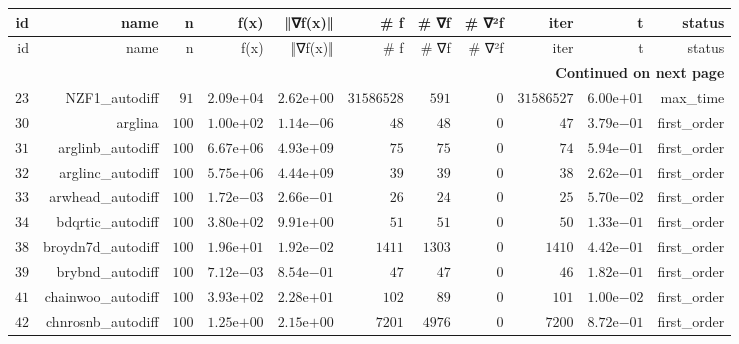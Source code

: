 \documentclass[varwidth=20cm,crop=true]{standalone}
\begin{document}
\begin{longtable}{rrrrrrrrrrr}
  \hline
  id & name & n & f(x) & ‖∇f(x)‖ & # f & # ∇f & # ∇²f & iter & t & status \\\hline
  \endfirsthead
  \hline
  id & name & n & f(x) & ‖∇f(x)‖ & # f & # ∇f & # ∇²f & iter & t & status \\\hline
  \endhead
  \hline
  \multicolumn{11}{r}{{\bfseries Continued on next page}}\\
  \hline
  \endfoot
  \endlastfoot
  \(    23\) & NZF1\_autodiff & \(    91\) & \( 2.09\)e\(+04\) & \( 2.62\)e\(+00\) & \(31586528\) & \(   591\) & \(     0\) & \(31586527\) & \( 6.00\)e\(+01\) & max\_time \\
  \(    30\) & arglina & \(   100\) & \( 1.00\)e\(+02\) & \( 1.14\)e\(-06\) & \(    48\) & \(    48\) & \(     0\) & \(    47\) & \( 3.79\)e\(-01\) & first\_order \\
  \(    31\) & arglinb\_autodiff & \(   100\) & \( 6.67\)e\(+06\) & \( 4.93\)e\(+09\) & \(    75\) & \(    75\) & \(     0\) & \(    74\) & \( 5.94\)e\(-01\) & first\_order \\
  \(    32\) & arglinc\_autodiff & \(   100\) & \( 5.75\)e\(+06\) & \( 4.44\)e\(+09\) & \(    39\) & \(    39\) & \(     0\) & \(    38\) & \( 2.62\)e\(-01\) & first\_order \\
  \(    33\) & arwhead\_autodiff & \(   100\) & \( 1.72\)e\(-03\) & \( 2.66\)e\(-01\) & \(    26\) & \(    24\) & \(     0\) & \(    25\) & \( 5.70\)e\(-02\) & first\_order \\
  \(    34\) & bdqrtic\_autodiff & \(   100\) & \( 3.80\)e\(+02\) & \( 9.91\)e\(+00\) & \(    51\) & \(    51\) & \(     0\) & \(    50\) & \( 1.33\)e\(-01\) & first\_order \\
  \(    38\) & broydn7d\_autodiff & \(   100\) & \( 1.96\)e\(+01\) & \( 1.92\)e\(-02\) & \(  1411\) & \(  1303\) & \(     0\) & \(  1410\) & \( 4.42\)e\(-01\) & first\_order \\
  \(    39\) & brybnd\_autodiff & \(   100\) & \( 7.12\)e\(-03\) & \( 8.54\)e\(-01\) & \(    47\) & \(    47\) & \(     0\) & \(    46\) & \( 1.82\)e\(-01\) & first\_order \\
  \(    41\) & chainwoo\_autodiff & \(   100\) & \( 3.93\)e\(+02\) & \( 2.28\)e\(+01\) & \(   102\) & \(    89\) & \(     0\) & \(   101\) & \( 1.00\)e\(-02\) & first\_order \\
  \(    42\) & chnrosnb\_autodiff & \(   100\) & \( 1.25\)e\(+00\) & \( 2.15\)e\(+00\) & \(  7201\) & \(  4976\) & \(     0\) & \(  7200\) & \( 8.72\)e\(-01\) & first\_order \\

\end{longtable}
\end{document}
